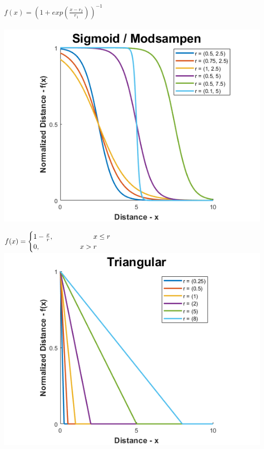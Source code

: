 \documentclass[12pt, a4paper, titlepage, openany]{book}
\begin{document}
\begin{description}[labelsep=1cm, labelwidth=2cm, nosep,,style=multiline,leftmargin=3cm]
\begin{description}[labelsep=14em, labelwidth=10em, nosep,style=multiline,leftmargin=6cm]
	\item[\texttt{"sigmoid"/"modsampen"}]	$f(x) = (1+exp(\frac{x-r_2}{r_1}))^{-1}$\\ \ \\
		\includegraphics[scale=.5]{Fuzz2v1.png} \\

	\item[\texttt{"triangular"}]	  $f(x) = \begin{cases} 1 - \frac{x}{r},  \hspace{20mm}  x\le r 
	\\ 0,  \hspace{20mm}  x>r \end{cases}$\\
		\includegraphics[scale=.5]{FuzzTriv1.png} \\


\end{description}
\end{description}
\end{document}
